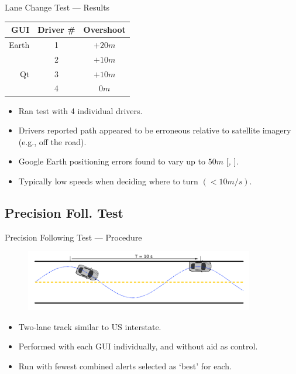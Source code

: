 \documentclass{beamer}
\newcommand{\citeitem}[1]{[\emph{\Citeauthor*{#1}, \citeyear{#1} }]}
\begin{document}
    \begin{frame}{Lane Change Test --- Results}
      \begin{table}[htbp] \centering \footnotesize
        \begin{tabular}{rc|c}
          GUI&    Driver \#&     Overshoot \\\hline\hline
          Earth&      1       &       $+20m$  \\
               &      2       &       $+10m$  \\ \hline
          Qt   &      3       &       $+10m$  \\
               &      4       &       $0m$    \\ \hline  
        \end{tabular}
        \label{tab:lanechangeresults}
      \end{table}
      \begin{itemize} \footnotesize
        \item Ran test with 4 individual drivers.
        \item Drivers reported path appeared to be erroneous relative to satellite imagery (e.g., off the road).
        \item Google Earth positioning errors found to vary up to $50m$ \citeitem{ge_accuracy}.
        \item Typically low speeds when deciding where to turn $(<10m/s)$.
      \end{itemize}
    \end{frame}



  \subsection{Precision Foll. Test}

    \begin{frame}{Precision Following Test --- Procedure}
      \begin{figure}
        \includegraphics[width=10cm]{../graphics/precision_following_diagram.png}
      \end{figure}   
      \begin{itemize} \footnotesize
        \item Two-lane track similar to US interstate.
        \item Performed with each GUI individually, and without aid as control.
        \item Run with fewest combined alerts selected as `best' for each.
      \end{itemize}
    \end{frame}
\end{document}
